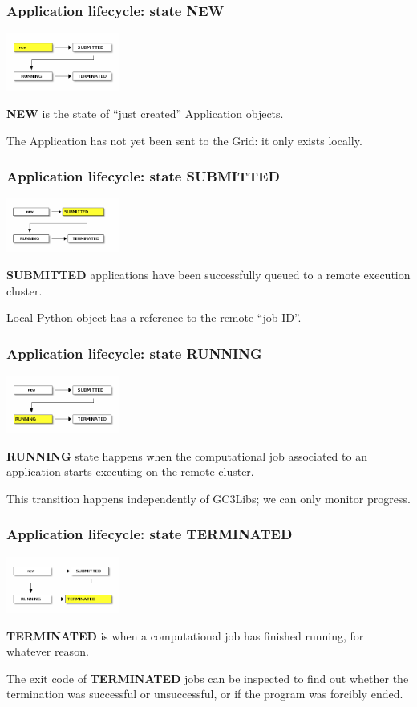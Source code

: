\documentclass[presentation]{beamer}
\begin{document}
\begin{frame}
\frametitle{Application lifecycle: state NEW}
\label{sec-8}


  \includegraphics[width=10em]{state-NEW_f7204a67024e58d84956e1cb72fa3f1efb7b5630.png}

  \textbf{NEW} is the state of ``just created'' Application objects.

  The Application has not yet been sent to the Grid: it only exists
  locally.
\end{frame}
\begin{frame}
\frametitle{Application lifecycle: state SUBMITTED}
\label{sec-9}


  \includegraphics[width=10em]{state-SUBMITTED_ca4e98e5ac36c4ab598d3dd313597f0557206797.png}

  \textbf{SUBMITTED} applications have been successfully queued to a remote
   execution cluster.

   Local Python object has a reference to the remote ``job ID''.
\end{frame}
\begin{frame}
\frametitle{Application lifecycle: state RUNNING}
\label{sec-10}


  \includegraphics[width=10em]{state-RUNNING_a404c5066c531b1cff0eb57d014cd99da9472404.png}

  \textbf{RUNNING} state happens when the computational job associated to an
   application starts executing on the remote cluster.

   This transition happens independently of GC3Libs; we can only
   monitor progress.
\end{frame}
\begin{frame}
\frametitle{Application lifecycle: state TERMINATED}
\label{sec-11}


  \includegraphics[width=10em]{state-TERMINATED_bd71dc0936d0d6c2ff2cb878d5d8b2b1437ad198.png}

  \textbf{TERMINATED} is when a computational job has finished running,
  for whatever reason.

  The exit code of \textbf{TERMINATED} jobs can be inspected to find out
  whether the termination was successful or unsuccessful, or if the
  program was forcibly ended.
\end{frame}
\end{document}
